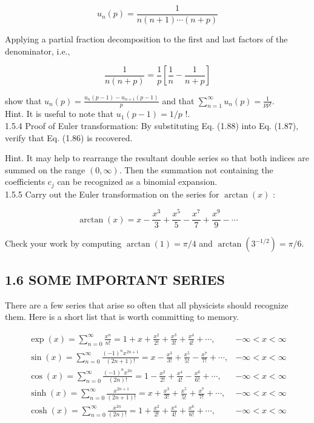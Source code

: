 \documentclass[10pt]{article}
\begin{document}
$$
u_{n}(p)=\frac{1}{n(n+1) \cdots(n+p)}
$$

Applying a partial fraction decomposition to the first and last factors of the denominator, i.e.,

$$
\frac{1}{n(n+p)}=\frac{1}{p}\left[\frac{1}{n}-\frac{1}{n+p}\right]
$$

show that $u_{n}(p)=\frac{u_{n}(p-1)-u_{n+1}(p-1)}{p}$ and that $\sum_{n=1}^{\infty} u_{n}(p)=\frac{1}{p p!}$.\\
Hint. It is useful to note that $u_{1}(p-1)=1 / p$ !.\\
1.5.4 Proof of Euler transformation: By substituting Eq. (1.88) into Eq. (1.87), verify that Eq. (1.86) is recovered.

Hint. It may help to rearrange the resultant double series so that both indices are summed on the range $(0, \infty)$. Then the summation not containing the coefficients $c_{j}$ can be recognized as a binomial expansion.\\
1.5.5 Carry out the Euler transformation on the series for $\arctan (x)$ :

$$
\arctan (x)=x-\frac{x^{3}}{3}+\frac{x^{5}}{5}-\frac{x^{7}}{7}+\frac{x^{9}}{9}-\cdots
$$

Check your work by computing $\arctan (1)=\pi / 4$ and $\arctan \left(3^{-1 / 2}\right)=\pi / 6$.

\subsection*{1.6 SOME IMPORTANT SERIES}
There are a few series that arise so often that all physicists should recognize them. Here is a short list that is worth committing to memory.

\[
\begin{array}{lll}
\exp (x)=\sum_{n=0}^{\infty} \frac{x^{n}}{n!}=1+x+\frac{x^{2}}{2!}+\frac{x^{3}}{3!}+\frac{x^{4}}{4!}+\cdots, & -\infty<x<\infty \\
\sin (x)=\sum_{n=0}^{\infty} \frac{(-1)^{n} x^{2 n+1}}{(2 n+1)!}=x-\frac{x^{3}}{3!}+\frac{x^{5}}{5!}-\frac{x^{7}}{7!}+\cdots, & -\infty<x<\infty \\
\cos (x)=\sum_{n=0}^{\infty} \frac{(-1)^{n} x^{2 n}}{(2 n)!}=1-\frac{x^{2}}{2!}+\frac{x^{4}}{4!}-\frac{x^{6}}{6!}+\cdots, & -\infty<x<\infty \\
\sinh (x)=\sum_{n=0}^{\infty} \frac{x^{2 n+1}}{(2 n+1)!}=x+\frac{x^{3}}{3!}+\frac{x^{5}}{5!}+\frac{x^{7}}{7!}+\cdots, & -\infty<x<\infty \\
\cosh (x)=\sum_{n=0}^{\infty} \frac{x^{2 n}}{(2 n)!}=1+\frac{x^{2}}{2!}+\frac{x^{4}}{4!}+\frac{x^{6}}{6!}+\cdots, & -\infty<x<\infty \tag{1.95}
\end{array}
\]
\end{document}
